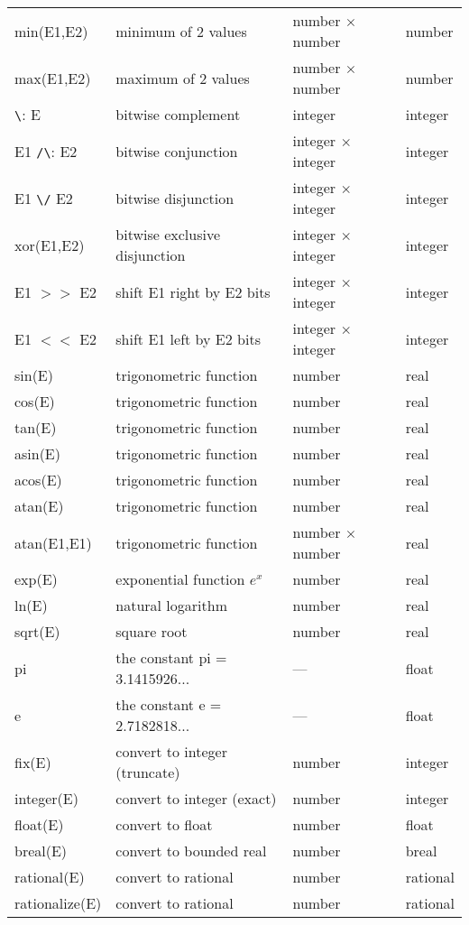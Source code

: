 {\begin{tabular}{l l l l}
min(E1,E2) & minimum of 2 values & number $\times$ number & number \\
max(E1,E2) & maximum of 2 values & number $\times$ number & number \\
\verb:\: E & bitwise complement & integer & integer \\
E1 \verb:/\: E2  & bitwise conjunction & integer $\times$ integer & integer \\
E1 \verb:\/: E2 & bitwise disjunction & integer $\times$ integer & integer \\
xor(E1,E2) & bitwise exclusive disjunction & integer $\times$ integer & integer \\
E1 $>>$ E2 & shift E1 right by E2 bits & integer $\times$ integer & integer \\
E1 $<<$ E2 & shift E1 left by E2 bits & integer $\times$ integer & integer \\
sin(E)     & trigonometric function & number & real \\
cos(E)     & trigonometric function & number & real \\
tan(E)     & trigonometric function & number & real \\
asin(E)    & trigonometric function & number & real \\
acos(E)    & trigonometric function & number & real \\
atan(E)    & trigonometric function & number & real \\
atan(E1,E1) & trigonometric function & number $\times$ number & real \\
exp(E)     & exponential function \( e^{x} \) & number & real \\
ln(E)      & natural logarithm & number & real \\
sqrt(E)    & square root & number & real \\
pi         & the constant pi = 3.1415926...  & --- & float \\
e          & the constant e = 2.7182818... & --- & float \\
fix(E)     & convert to integer (truncate) & number & integer \\
integer(E) & convert to integer (exact) & number & integer \\
float(E)   & convert to float & number & float \\
breal(E)   & convert to bounded real & number & breal \\
rational(E)   & convert to rational & number & rational \\
rationalize(E) & convert to rational & number & rational \\

\end{tabular}}
